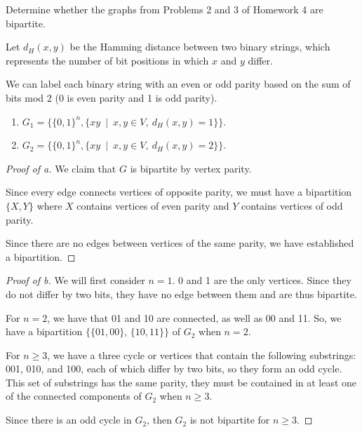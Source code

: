 \documentclass[../hw5]{subfiles}
\begin{document}
\begin{problem}
Determine whether the graphs from Problems 2 and 3 of Homework 4 are bipartite.

Let $d_H(x,y)$ be the Hamming distance between two binary strings, which represents the number of bit positions in which  $x$ and  $y$ differ.

We can label each binary string with an even or odd parity based on the sum of bits mod 2 (0 is even parity and 1 is odd parity).
\begin{enumerate}[label=\alph*)]
	\item $G_1=\{\{0,1\}^n, \{xy\ \mid\ x,y \in V,\ d_H(x,y)=1 \}  \} $.
	\item $G_2=\{\{0,1\}^n, \{xy\ \mid\ x,y \in V,\ d_H(x,y)=2 \}  \} $.
\end{enumerate}
\end{problem}
\begin{proof}[Proof of a]
	We claim that $G$ is bipartite by vertex parity.

	Since every edge connects vertices of opposite parity, we must have a bipartition $\{X,Y\}$ where $X$ contains vertices of even parity and $Y$ contains vertices of odd parity.

	Since there are no edges between vertices of the same parity, we have established a bipartition.
\end{proof}
\begin{proof}[Proof of b]
	We will first consider $n=1$.
	0 and 1 are the only vertices.
	Since they do not differ by two bits, they have no edge between them and are thus bipartite.

	For  $n=2$, we have that 01 and 10 are connected, as well as 00 and 11.
	So, we have a bipartition  $\{\{01,00\},\, \{10,11\}\}$ of $G_2$ when $n=2$.

	For $n\ge 3$, we have a three cycle or vertices that contain the following substrings: 001, 010, and 100, each of which differ by two bits, so they form an odd cycle.
	This set of substrings has the same parity, they must be contained in at least one of the connected components of $G_2$ when $n\ge 3$.

	Since there is an odd cycle in $G_2$, then $G_2$ is not bipartite for $n\ge 3$.
\end{proof}
\end{document}
